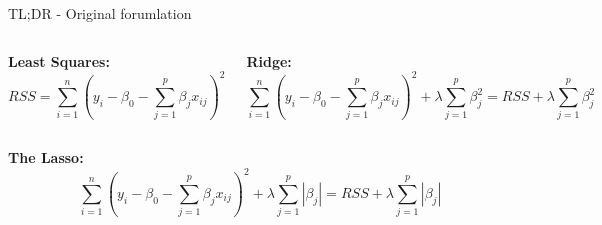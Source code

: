 \documentclass[aspectratio=169,usenames,dvipsnames]{beamer}
\begin{document}
	
		

\begin{frame}[c]{TL;DR - Original forumlation}

	\begin{columns}
	\centering
	\textbf{Least Squares:}
	\footnotesize
	\begin{equation*}
		RSS = \sum_{i=1}^n \left(y_i - \beta_0 - \sum_{j=1}^p \beta_j x_{ij}\right)^2
	\end{equation*}
	
	\centering
	\textbf{Ridge:}
	\footnotesize
	\begin{equation*}
		\sum_{i=1}^n \left(y_i - \beta_0 - \sum_{j=1}^p \beta_j x_{ij}\right)^2 + \lambda \sum_{j=1}^p \beta_j^2 = RSS + \lambda \sum_{j=1}^p \beta_j^2
	\end{equation*}
	
	\end{columns}
	\centering
	
	\vspace{.2in}
	
	\textbf{The Lasso:}
	\footnotesize
	\begin{equation*}
		\sum_{i=1}^n \left(y_i - \beta_0 - \sum_{j=1}^p \beta_j x_{ij}\right)^2
			+ \lambda \sum_{j=1}^p |\beta_j|
		= RSS + \lambda \sum_{j=1}^p |\beta_j|
	\end{equation*}
	
	
	\end{frame}
	
	
	
	
\end{document}
